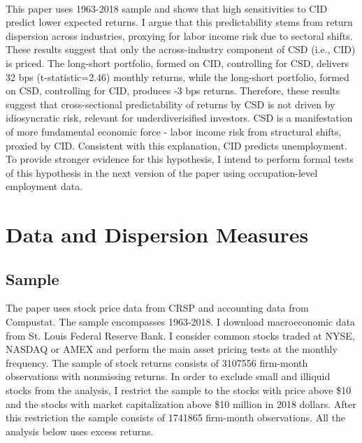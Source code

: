 \documentclass[12pt]{article}
\begin{document}
\paragraph{}
This paper uses 1963-2018 sample and shows that high sensitivities to CID predict lower expected returns. I argue that this predictability stems from return dispersion across industries, proxying for labor income risk due to sectoral shifts. These results suggest that only the across-industry component of CSD (i.e., CID) is priced. The long-short portfolio, formed on CID, controlling for CSD, delivers 32 bps (t-statistic=2.46) monthly returns, while the long-short portfolio, formed on CSD, controlling for CID, produces -3 bps returns. Therefore, these results suggest that cross-sectional predictability of returns by CSD is not driven by idiosyncratic risk, relevant for underdiverisified investors. CSD is a manifestation of more fundamental economic force - labor income risk from structural shifts, proxied by CID. Consistent with this explanation, CID predicts unemployment. To provide stronger evidence for this hypothesis, I intend to perform formal tests of this hypothesis in the next version of the paper using occupation-level employment data.


\section{Data and Dispersion Measures} \label{sec:Model}

\subsection{Sample}

The paper uses stock price data from CRSP and accounting data from Compustat. The sample encompasses 1963-2018. I download macroeconomic data from St. Louis Federal Reserve Bank. 
I consider common stocks traded at NYSE, NASDAQ or AMEX and perform the main asset pricing tests at the monthly frequency. The sample of stock returns consists of 3107556 firm-month observations with nonmissing returns. In order to exclude small and illiquid stocks from the analysis, I restrict the sample to the stocks with price above \$10 and the stocks with market capitalization above \$10 million in 2018 dollars. After this restriction the sample consists of 1741865 firm-month observations. All the analysis below uses excess returns.
\end{document}
